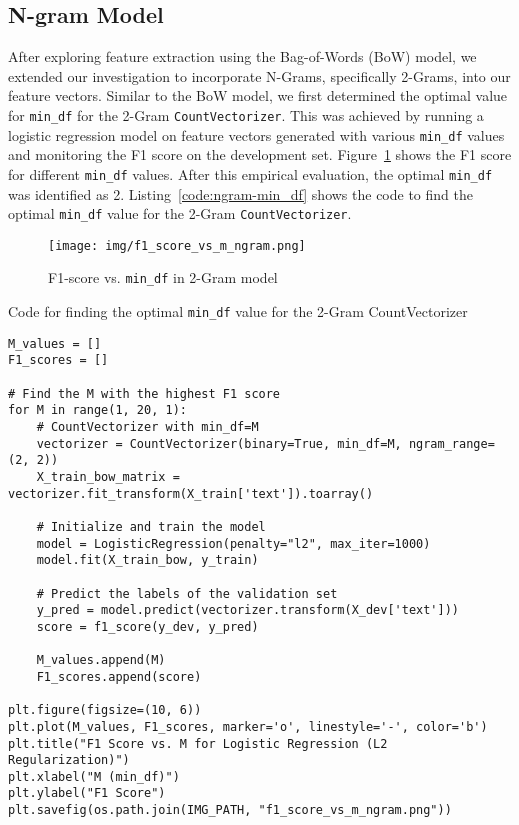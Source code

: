 \documentclass{article}
\begin{document}
\subsection{N-gram Model}

After exploring feature extraction using the Bag-of-Words (BoW) model, we extended our investigation to incorporate N-Grams, specifically 2-Grams, into our feature vectors. Similar to the BoW model, we first determined the optimal value for \texttt{min\_df} for the 2-Gram \texttt{CountVectorizer}. This was achieved by running a logistic regression model on feature vectors generated with various \texttt{min\_df} values and monitoring the F1 score on the development set. Figure~\ref{fig:ngram-min_df} shows the F1 score for different \texttt{min\_df} values. After this empirical evaluation, the optimal \texttt{min\_df} was identified as 2. Listing~\ref{code:ngram-min_df} shows the code to find the optimal \texttt{min\_df} value for the 2-Gram \texttt{CountVectorizer}.


\begin{figure}[!htbp]
    \centering
    \texttt{[image: img/f1\_score\_vs\_m\_ngram.png]}
    \caption{F1-score vs. \texttt{min\_df} in 2-Gram model}
    \label{fig:ngram-min_df}
\end{figure}

\begin{listing}[H]
\caption{Code for finding the optimal \texttt{min\_df} value for the 2-Gram CountVectorizer}
\label{code:ngram-min_df}
\begin{verbatim}
M_values = []
F1_scores = []

# Find the M with the highest F1 score
for M in range(1, 20, 1):
    # CountVectorizer with min_df=M
    vectorizer = CountVectorizer(binary=True, min_df=M, ngram_range=(2, 2))
    X_train_bow_matrix = vectorizer.fit_transform(X_train['text']).toarray()
    
    # Initialize and train the model
    model = LogisticRegression(penalty="l2", max_iter=1000)
    model.fit(X_train_bow, y_train)

    # Predict the labels of the validation set
    y_pred = model.predict(vectorizer.transform(X_dev['text']))
    score = f1_score(y_dev, y_pred)

    M_values.append(M)
    F1_scores.append(score)
    
plt.figure(figsize=(10, 6))
plt.plot(M_values, F1_scores, marker='o', linestyle='-', color='b')
plt.title("F1 Score vs. M for Logistic Regression (L2 Regularization)")
plt.xlabel("M (min_df)")
plt.ylabel("F1 Score")
plt.savefig(os.path.join(IMG_PATH, "f1_score_vs_m_ngram.png"))
\end{verbatim}
\end{listing}
\end{document}
